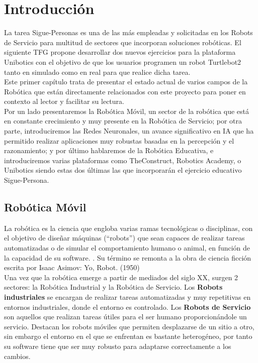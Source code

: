 \chapter{Introducción}
\label{cap:capitulo1}
\setcounter{page}{1}
\pagestyle{plain}

La tarea Sigue-Personas es una de las más empleadas y solicitadas en los Robots de Servicio para multitud de sectores que incorporan soluciones robóticas. El siguiente TFG propone desarrollar dos nuevos ejercicios para la plataforma Unibotics con el objetivo de que los usuarios programen un robot Turtlebot2 tanto en simulado como en real para que realice dicha tarea.\\

Este primer capítulo trata de presentar el estado actual de varios campos de la Robótica que están directamente relacionados con este proyecto para poner en contexto al lector y facilitar su lectura.\\

Por un lado presentaremos la Robótica Móvil, un sector de la robótica que está en constante crecimiento y muy presente en la Robótica de Servicio; por otra parte, introduciremos las Redes Neuronales, un avance significativo en IA que ha permitido realizar aplicaciones muy robustas basadas en la percepción y el razonamiento; y por último hablaremos de la Robótica Educativa, e introduciremos varias plataformas como TheConstruct, Robotics Academy, o Unibotics siendo estas dos últimas las que incorporarán el ejercicio educativo Sigue-Persona.



\section{Robótica Móvil}
\label{sec:robotica_movil}

La robótica es la ciencia que engloba varias ramas tecnológicas o disciplinas, con el objetivo de diseñar máquinas (``robots'') que sean capaces de realizar tareas automatizadas o de simular el comportamiento humano o animal, en función de la capacidad de su software. \cite{revistaderobots}. Su término se remonta a la obra de ciencia ficción escrita por Isaac Asimov: Yo, Robot. (1950)\\

Una vez que la robótica emerge a partir de mediados del siglo XX, surgen 2 sectores: la Robótica Industrial y la Robótica de Servicio. Los \textbf{Robots industriales} se encargan de realizar tareas automatizadas y muy repetitivas en entornos industriales, donde el entorno es controlado. Los \textbf{Robots de Servicio} son aquellos que realizan tareas útiles para el ser humano proporcionándole un servicio. Destacan los robots móviles que permiten desplazarse de un sitio a otro, sin embargo el entorno en el que se enfrentan es bastante heterogéneo, por tanto su software tiene que ser muy robusto para adaptarse correctamente a los cambios.\\

